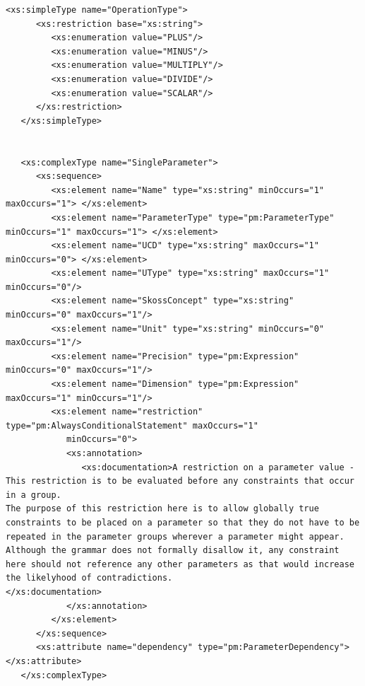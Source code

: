 \documentclass[a4paper,11pt] {ivoa}
\begin{document}
\begin{lstlisting}[style=listXML]
   <xs:simpleType name="OperationType">
      <xs:restriction base="xs:string">
         <xs:enumeration value="PLUS"/>
         <xs:enumeration value="MINUS"/>
         <xs:enumeration value="MULTIPLY"/>
         <xs:enumeration value="DIVIDE"/>
         <xs:enumeration value="SCALAR"/>
      </xs:restriction>
   </xs:simpleType>


   <xs:complexType name="SingleParameter">
      <xs:sequence>
         <xs:element name="Name" type="xs:string" minOccurs="1" maxOccurs="1"> </xs:element>
         <xs:element name="ParameterType" type="pm:ParameterType" minOccurs="1" maxOccurs="1"> </xs:element>
         <xs:element name="UCD" type="xs:string" maxOccurs="1" minOccurs="0"> </xs:element>
         <xs:element name="UType" type="xs:string" maxOccurs="1" minOccurs="0"/>
         <xs:element name="SkossConcept" type="xs:string" minOccurs="0" maxOccurs="1"/>
         <xs:element name="Unit" type="xs:string" minOccurs="0" maxOccurs="1"/>
         <xs:element name="Precision" type="pm:Expression" minOccurs="0" maxOccurs="1"/>
         <xs:element name="Dimension" type="pm:Expression" maxOccurs="1" minOccurs="1"/>
         <xs:element name="restriction" type="pm:AlwaysConditionalStatement" maxOccurs="1"
            minOccurs="0">
            <xs:annotation>
               <xs:documentation>A restriction on a parameter value - This restriction is to be evaluated before any constraints that occur in a group. 
The purpose of this restriction here is to allow globally true constraints to be placed on a parameter so that they do not have to be repeated in the parameter groups wherever a parameter might appear.
Although the grammar does not formally disallow it, any constraint here should not reference any other parameters as that would increase the likelyhood of contradictions.
</xs:documentation>
            </xs:annotation>
         </xs:element>
      </xs:sequence>
      <xs:attribute name="dependency" type="pm:ParameterDependency"> </xs:attribute>
   </xs:complexType>


\end{lstlisting}
\end{document}
